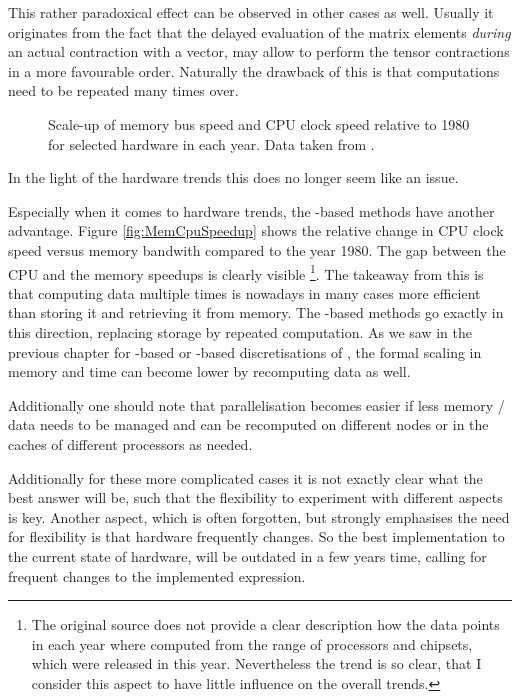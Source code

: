 This rather paradoxical effect
can be observed in other cases as well.
Usually it originates from the fact that the delayed evaluation of the matrix elements
\emph{during} an actual contraction with a vector,
may allow to perform the
tensor contractions in a more favourable order.
Naturally the drawback of this is that computations need to be repeated
many times over.
\begin{figure}
	\centering
	\caption[Scale-up of memory bus speed and CPU clock speed]
	{Scale-up of memory bus speed and CPU clock speed
		relative to 1980 for selected hardware in each year.
		Data taken from \cite{Gocon2014}.}
	\label{fig:MemCpuSpeedup}
\end{figure}
In the light of the hardware trends this does no longer seem like an issue.


Especially when it comes to hardware trends,
the \contraction-based methods have another advantage.
Figure \vref{fig:MemCpuSpeedup} shows the relative change
in CPU clock speed versus memory bandwith compared to the year 1980.
The gap between the CPU and the memory speedups
is clearly visible%
\footnote{The original source \cite{Gocon2014}
does not provide a clear description how the data points in each year
where computed from the range of processors and chipsets,
which were released in this year.
Nevertheless the trend is so clear, that I consider this aspect
to have little influence on the overall trends.}.
The takeaway from this is that
computing data multiple times is nowadays in many cases
more efficient than storing it and retrieving it from memory.
The \contraction-based methods go exactly in this direction,
replacing storage by repeated computation.
As we saw in the previous chapter
for \FE-based or \CS-based discretisations of \HF,
the formal scaling in memory and time
can become lower by recomputing data as well.

Additionally one should note that parallelisation becomes
easier if less memory / data needs to be managed
and can be recomputed on different nodes or in the caches of different
processors as needed.






Additionally for these more complicated cases
it is not exactly clear what the best answer will be,
such that the flexibility to experiment with different aspects is key.
Another aspect, which is often forgotten,
but strongly emphasises the need for flexibility
is that hardware frequently changes.
So the best implementation to the current state of hardware,
will be outdated in a few years time,
calling for frequent changes to the implemented \contraction expression.

